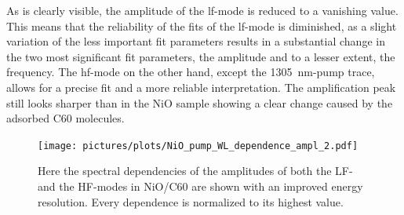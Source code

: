 As is clearly visible, the amplitude of the lf-mode is reduced to a vanishing value.
This means that the reliability of the fits of the lf-mode is diminished, as a slight variation of the less important fit parameters results in a substantial change in the two most significant fit parameters, the amplitude and to a lesser extent, the frequency.
The hf-mode on the other hand, except the \qty{1305}{nm}-pump trace, allows for a precise fit and a more reliable interpretation.
The amplification peak still looks sharper than in the NiO sample showing a clear change caused by the adsorbed C60 molecules.
\begin{figure}[ht]
    \centering
    \texttt{[image: pictures/plots/NiO\_pump\_WL\_dependence\_ampl\_2.pdf]}
    \caption{Here the spectral dependencies of the amplitudes of both the LF- and the HF-modes in NiO/C60 are shown with an improved energy resolution. Every dependence is normalized to its highest value.}
    \label{fig:NiO_pump_WL_dependence_ampl_2}
\end{figure}
\FloatBarrier

